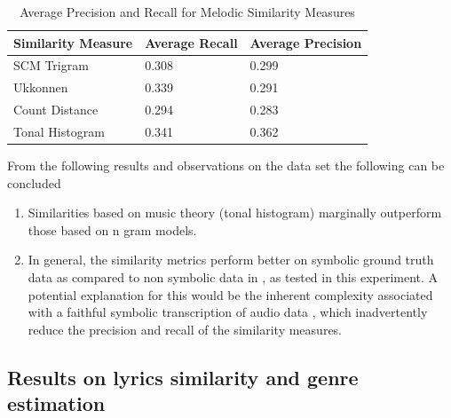 \begin{table}[h]
\begin{center}
    \begin{tabular}{| l | l | l |}
    \hline
    Similarity Measure & Average Recall & Average Precision \\ \hline
    SCM Trigram & 0.308 & 0.299 \\ \hline
    Ukkonnen & 0.339 & 0.291 \\ \hline
    Count Distance & 0.294 & 0.283  \\ \hline
    Tonal Histogram & 0.341 & 0.362  \\ \hline
    \end{tabular}
\end{center}
\caption{Average Precision and Recall for Melodic Similarity Measures}
\end{table}

\noindent From the following results and observations on the data set the following can be concluded

\begin{enumerate}
\item Similarities based on music theory (tonal histogram) marginally outperform those based on n gram models. 
\item In general, the similarity metrics perform better on symbolic ground truth data \cite{mirexsym} as compared to non symbolic data in \cite{msd}, as tested in this experiment. A potential explanation for this would be the inherent complexity associated with a faithful symbolic transcription of audio data \cite{melextract}, which inadvertently reduce the precision and recall of the similarity measures. 
\end{enumerate}

\subsection{Results on lyrics similarity and genre estimation} \label{genrelabels}

